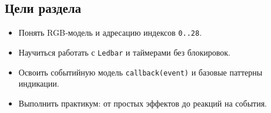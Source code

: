 \subsection*{Цели раздела}
\begin{itemize}
\item Понять RGB‑модель и адресацию индексов \texttt{0..28}.
\item Научиться работать с \texttt{Ledbar} и таймерами без блокировок.
\item Освоить событийную модель \texttt{callback(event)} и базовые паттерны индикации.
\item Выполнить практикум: от простых эффектов до реакций на события.
\end{itemize}
